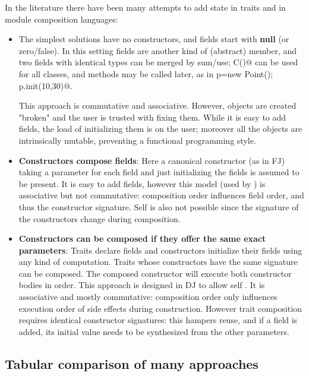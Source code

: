In the literature there have been many attempts to add state in traits and in module composition languages:
\begin{itemize}  
\item The simplest solutions have no constructors, and fields start with {\bf null} (or zero/false).
In this setting fields are another kind of (abstract) member, and two fields with identical types can be merged by sum/use; \Q@new C()@ can be used for all classes, and \Q@init@ methods may be called later, as in
  \Q@Point p=new Point(); p.init(10,30)@.
  
This approach is commutative and associative.
  However, objects are created "broken" and the user is trusted with fixing them.
  While it is easy to add fields, the load of initializing them is on the user; moreover
    all the objects are intrinsically mutable, preventing a functional programming style.
\item {\bf Constructors compose fields}:
Here a canonical constructor (as in FJ) taking a parameter for each field and just initializing the fields is assumed to be present.
It is easy to add fields, however this model (used by \cite{fjig}) is associative but not commutative: composition order influences field order, and thus the constructor signature.
Self  is also not possible 
since the signature of the constructors change during composition.


\item {\bf Constructors can be composed if they offer the same exact parameters}:
Traits declare fields and constructors initialize their fields using any kind of computation.
Traits whose constructors have the same signature can be composed.
The composed constructor will execute both constructor bodies in order.
This approach is designed in DJ to allow self .
It is associative and mostly commutative: composition order only influences execution order of side effects during construction.
However trait composition requires identical constructor signatures: this
hampers reuse, and if a field is added, its initial value needs to be
synthesized from the other parameters.
\end{itemize}
\saveSpace\saveSpace
\subsection{Tabular comparison of many approaches}
\saveSpace


